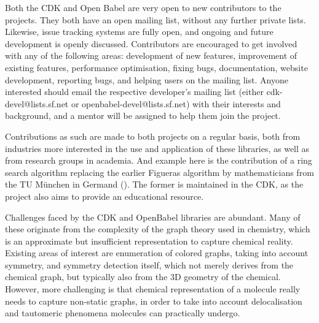 \documentclass{sig-alternate}
\begin{document}
Both the CDK and Open Babel are very open to new contributors to the projects.
They both have an open mailing list, without any further private lists.
Likewise, issue tracking systems are fully open, and ongoing and future
development is openly discussed. Contributors are encouraged to get involved
with any of the following areas: development of new features, improvement of
existing features, performance optimisation, fixing bugs, documentation, website
development, reporting bugs, and helping users on the mailing list. Anyone
interested should email the respective developer’s mailing list (either
cdk-devel@lists.sf.net or openbabel-devel@lists.sf.net) with their interests and
background, and a mentor will be assigned to help them join the project.

Contributions as such are made to both projects on a regular basis, both from
industries more interested in the use and application of these libraries, as
well as from research groups in academia. And example here is the contribution
of a ring search algorithm replacing the earlier Figueras algorithm by
mathematicians from the TU M\"{u}nchen in Germand (\cite{Berger2004}). The former is
maintained in the CDK, as the project also aims to provide an educational
resource.  

Challenges faced by the CDK and OpenBabel libraries are abundant. Many of these
originate from the complexity of the graph theory used in chemistry, which is an
approximate but insufficient representation to capture chemical reality.
Existing areas of interest are enumeration of colored graphs, taking into
account symmetry, and symmetry detection itself, which not merely derives from
the chemical graph, but typically also from the 3D geometry of the chemical.
However, more challenging is that chemical representation of a molecule really
needs to capture non-static graphs, in order to take into account delocalisation
and tautomeric phenomena molecules can practically undergo.


  
  
\end{document}
